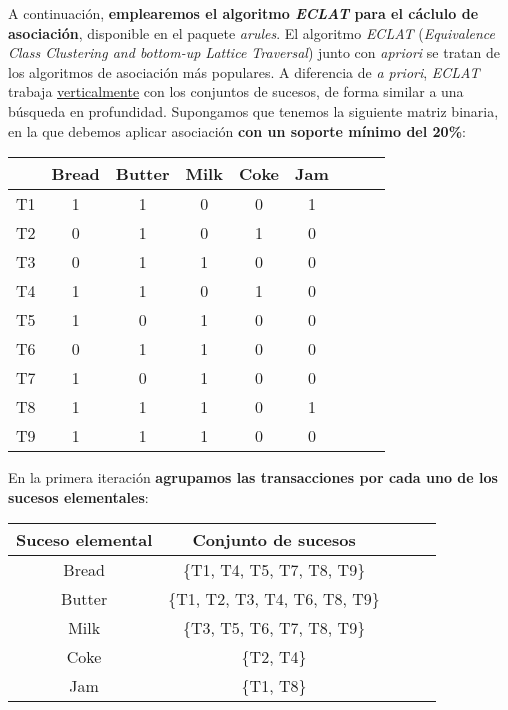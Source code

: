\documentclass [a4paper] {article}
\begin{document}
A continuación, \textbf{emplearemos el algoritmo \textit{ECLAT} para el cáclulo de asociación}, disponible en el paquete \textit{arules}.
El algoritmo \textit{ECLAT} (\textit{Equivalence Class Clustering and bottom-up Lattice Traversal}) junto con \textit{apriori} se tratan de los algoritmos de asociación más populares. A diferencia de \textit{a priori},
\textit{ECLAT} trabaja \underline{verticalmente} con los conjuntos de sucesos, de forma similar a una búsqueda en profundidad. Supongamos que tenemos la siguiente matriz binaria, en la que debemos aplicar asociación
\textbf{con un soporte mínimo del 20\%}:

\begin{center}
\begin{tabular}{|c|c|c|c|c|c|c|c|c|}
\hline
               & Bread & Butter & Milk & Coke & Jam \\ \hline
T1             & 1   & 1    & 0    & 0     & 1        \\ \hline
T2             & 0   & 1    & 0    & 1     & 0        \\ \hline
T3             & 0   & 1    & 1    & 0     & 0        \\ \hline
T4             & 1   & 1    & 0    & 1     & 0        \\ \hline
T5             & 1   & 0    & 1    & 0     & 0        \\ \hline
T6             & 0   & 1    & 1    & 0     & 0        \\ \hline
T7             & 1   & 0    & 1    & 0     & 0        \\ \hline
T8             & 1   & 1    & 1    & 0     & 1        \\ \hline
T9             & 1   & 1    & 1    & 0     & 0        \\ \hline
\end{tabular}
\end{center}

En la primera iteración \textbf{agrupamos las transacciones por cada uno de los sucesos elementales}:

\begin{center}
\begin{tabular}{|c|c|c|c|c|}
\hline
Suceso elemental   & Conjunto de sucesos             \\ \hline
Bread              & \{T1, T4, T5, T7, T8, T9\}      \\ \hline
Butter             & \{T1, T2, T3, T4, T6, T8, T9\}  \\ \hline
Milk               & \{T3, T5, T6, T7, T8, T9\}      \\ \hline
Coke               & \{T2, T4\}                      \\ \hline
Jam                & \{T1, T8\}                      \\ \hline
\end{tabular}
\end{center}
\end{document}
